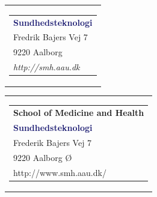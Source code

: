 


% 
\thispagestyle{empty}
\begin{nopagebreak}
{\samepage 
	
	
	
	
	

\begin{tabular}{r}
\parbox{\textwidth}{  
\hfill \hspace{2cm} \parbox{8cm}{\begin{tabular}{l} %
{\small \textbf{\textcolor{MidnightBlue}{Sundhedsteknologi}}}\\ 
{\small \textcolor{NavyBlue}{Fredrik Bajers Vej 7}} \\
{\small \textcolor{NavyBlue}{9220 Aalborg}} \\
{\small \textcolor{NavyBlue}{\emph{http://smh.aau.dk}}}
\end{tabular}}}
\end{tabular}


				\begin{flushright}
					\begin{tabular}{r}
						\parbox{\textwidth}{
							\hfill \parbox{4.9cm}{\begin{tabular}{l}
									{\sf\small \textbf\textcolor{NavyBlue}{School of Medicine and Health}}\\
									{\sf\small  \textbf{\textcolor{MidnightBlue}{Sundhedsteknologi}}} \\
									{\sf\small \textcolor{NavyBlue}{Frederik Bajers Vej 7}} \\
									{\sf\small \textcolor{NavyBlue}{9220 Aalborg \O}} \\	
									{\sf\small http://www.smh.aau.dk/}
								\end{tabular}}}
								\\
							\end{tabular}
						\end{flushright}








}
\end{nopagebreak}
